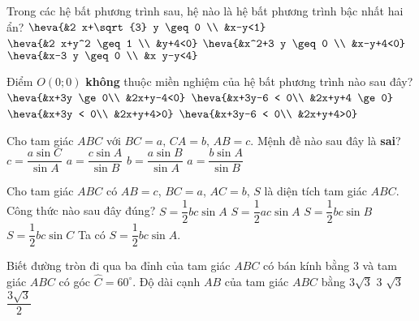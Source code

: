 \begin{ex}%
Trong các hệ bất phương trình sau, hệ nào là hệ bất phương trình bậc nhất hai ẩn?
\choice
{\True $\heva{&2 x+\sqrt{3} y \geq 0 \\ &x-y<1}$}
{$\heva{&2 x+y^2 \geq 1 \\ &y+4<0}$}
{$\heva{&x^2+3 y \geq 0 \\ &x-y+4<0}$}
{$\heva{&x-3 y \geq 0 \\ &x y-y<4}$}
\end{ex}

\begin{ex}%
Điểm $O(0;0)$ \textbf{không} thuộc miền nghiệm của hệ bất phương trình nào sau đây?
\choice
{$\heva{&x+3y \ge 0\\ &2x+y-4<0}$}
{$\heva{&x+3y-6 < 0\\ &2x+y+4 \ge 0}$}
{\True $\heva{&x+3y < 0\\ &2x+y+4>0}$}
{$\heva{&x+3y-6 < 0\\ &2x+y+4>0}$}
\end{ex}

\begin{ex}%
Cho tam giác $ABC$ với $BC=a,\,CA=b,\,AB=c.$ Mệnh đề nào sau đây là \textbf{sai}?
\choice
{$c=\dfrac{a\sin C}{\sin A}$}
{\True $a=\dfrac{c\sin A}{\sin B}$}
{$b=\dfrac{a\sin B}{\sin A}$}
{$a=\dfrac{b\sin A}{\sin B}$}
\end{ex}

\begin{ex}%
Cho tam giác $ABC$ có $AB=c$, $BC=a$, $AC=b$, $S$ là diện tích tam giác $ABC$. Công thức nào sau đây đúng?
\choice
{\True $S=\dfrac{1}{2}bc\sin A$}
{$S=\dfrac{1}{2}ac\sin A$}
{$S=\dfrac{1}{2}bc\sin B$}
{$S=\dfrac{1}{2}bc\sin C$}
\loigiai
{
Ta có $S=\dfrac{1}{2}bc\sin A$.
}
\end{ex}

\begin{ex}%
Biết đường tròn đi qua ba đỉnh của tam giác $A B C$ có bán kính bằng $3$ và tam giác $A B C$ có góc $\widehat{C}=60^{\circ}$. Độ dài cạnh $A B$ của tam giác $A B C$ bằng
\choice
{\True $3 \sqrt{3}$}
{$3$}
{$\sqrt{3}$}
{$\dfrac{3 \sqrt{3}}{2}$}
\end{ex}

